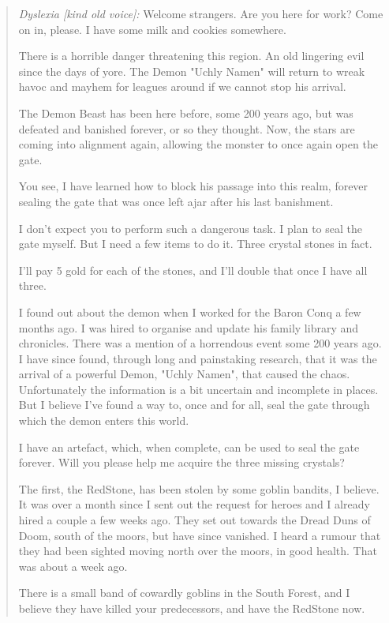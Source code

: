 \documentclass[11pt, twoside, titlepage, a4paper]{report}
\newenvironment{readoutloud}%
{\begin{quote}\begin{itshape}}%
{\end{itshape}\end{quote}}%
\begin{document}
\begin{readoutloud}
\emph{Dyslexia [kind old voice]:} Welcome strangers. Are you here for work? Come on in, please. I have some milk and cookies somewhere.

There is a horrible danger threatening this region. An old lingering evil since the days of yore. The Demon "Uchly Namen" will return to wreak havoc and mayhem for leagues around if we cannot stop his arrival.

The Demon Beast has been here before, some 200 years ago, but was defeated and banished forever, or so they thought. Now, the stars are coming into alignment again, allowing the monster to once again open the gate.

You see, I have learned how to block his passage into this realm, forever sealing the gate that was once left ajar after his last banishment.

I don't expect you to perform such a dangerous task. I plan to seal the gate myself. But I need a few items to do it. Three crystal stones in fact.

I'll pay 5 gold for each of the stones, and I'll double that once I have all three.

I found out about the demon when I worked for the Baron Conq a few months ago. I was hired to organise and update his family library and chronicles. There was a mention of a horrendous event some 200 years ago. I have since found, through long and painstaking research, that it was the arrival of a powerful Demon, "Uchly Namen", that caused the chaos. Unfortunately the information is a bit uncertain and incomplete in places. But I believe I've found a way to, once and for all, seal the gate through which the demon enters this world.

I have an artefact, which, when complete, can be used to seal the gate forever. Will you please help me acquire the three missing crystals?

The first, the RedStone, has been stolen by some goblin bandits, I believe.
It was over a month since I sent out the request for heroes and I already hired a couple a few weeks ago. They set out towards the Dread Duns of Doom, south of the moors, but have since vanished. I heard a rumour that they had been sighted moving north over the moors, in good health. That was about a week ago.

There is a small band of cowardly goblins in the South Forest, and I believe they have killed your predecessors, and have the RedStone now.


\end{readoutloud}
\end{document}
